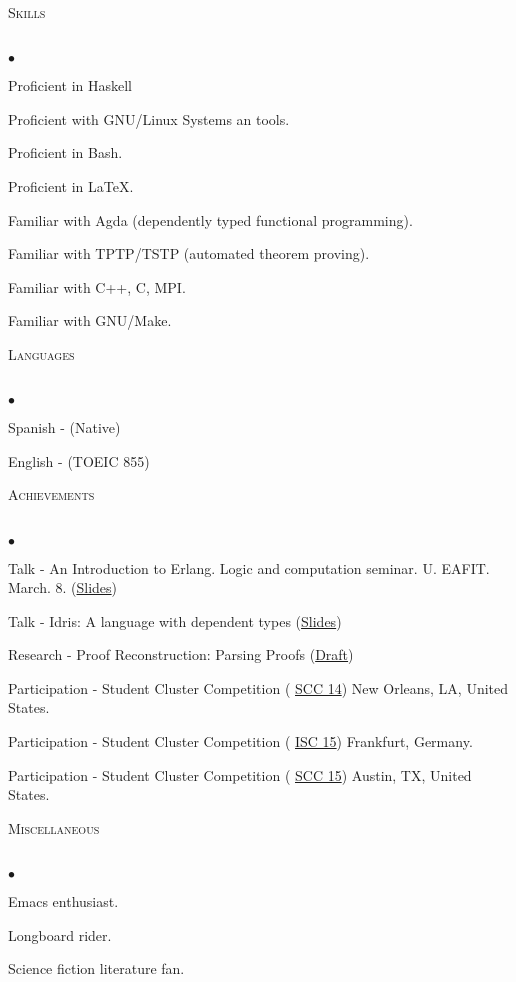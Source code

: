 \documentclass[a4]{article}
\newcommand{\lineunder}{
  \vspace*{-8pt} \\
  \hspace*{-18pt} \hrulefill \\
}
\newcommand{\header}[1]{
  {\hspace*{-15pt}\vspace*{6pt} \textsc{#1}}
  \vspace*{-6pt} \lineunder
}
\newenvironment{achievements}{
  \begin{list}{$\bullet$}{\topsep 0pt \itemsep -2pt}
}
{
  \vspace*{4pt}
  \end{list}
}
\begin{document}
\bigskip


\header{Skills}
\begin{achievements}
\item Proficient in Haskell
\item Proficient with GNU/Linux Systems an tools.
\item Proficient in Bash.
\item Proficient in \LaTeX.
\item Familiar with Agda (dependently typed functional programming).
\item Familiar with TPTP/TSTP (automated theorem proving).
\item Familiar with C++, C, MPI.
\item Familiar with GNU/Make.
\end{achievements}

\header{Languages}
\begin{achievements}
\item Spanish - (Native)
\item English - (TOEIC 855)
\end{achievements}

\newpage

\header{Achievements}
\begin{achievements}
\item Talk - An Introduction to Erlang. Logic and computation seminar. U. EAFIT. March. 8.
  (\href{http://agomezl.github.io/slides/erlang.pdf}{Slides})
\item Talk - Idris: A language with dependent types
  (\href{http://agomezl.github.io/slides/Idris.pdf}{Slides})
\item Research - Proof Reconstruction: Parsing Proofs
 (\href{https://repository.eafit.edu.co/handle/10784/5484}{Draft})
\item Participation - Student Cluster Competition (
  \href{http://sc14.supercomputing.org/engage/hpc-interconnections/sc14-student-cluster-competition}
  {SCC 14}) New Orleans, LA, United States.
\item Participation - Student Cluster Competition (
\href{http://www.hpcadvisorycouncil.com/events/2015/isc15-student-cluster-competition/team_purdue_eafit.php}
  {ISC 15}) Frankfurt, Germany.
\item Participation - Student Cluster Competition (
  \href{http://sc15.supercomputing.org/conference-program/student-programs/sc15-student-cluster-competition}
  {SCC 15}) Austin, TX, United States.
\end{achievements}

\bigskip
\header{Miscellaneous}
\begin{achievements}
\item Emacs enthusiast.
\item Longboard rider.
\item Science fiction literature fan.
\end{achievements}
\end{document}
